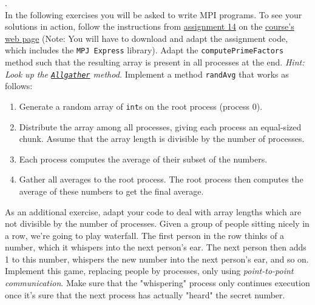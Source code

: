 \documentclass[main]{subfiles}
\begin{document}
\begin{ExerciseList}
    
    \Exercise[title={Message Passing},label=MPI]. \quad \\
        In the following exercises you will be asked to write MPI programs. To see your solutions in action, follow the instructions from \href{https://spcl.inf.ethz.ch/Teaching/2020-pp/exercises/assignment14.pdf}{assignment 14} on the \href{https://spcl.inf.ethz.ch/Teaching/2020-pp/}{course's web page} (Note: You will have to download and adapt the assignment code, which includes the \texttt{MPJ Express} library). 
        \Question Adapt the \texttt{computePrimeFactors} method such that the resulting array is present in all processes at the end. \textit{Hint: Look up the \href{https://www.open-mpi.org/doc/v3.0/man3/MPI_Allgather.3.php}{\texttt{Allgather}} method.}
        \Question Implement a method \texttt{randAvg} that works as follows:
            \begin{enumerate}
                \item Generate a random array of \texttt{int}s on the root process (process 0).
                \item Distribute the array among all processes, giving each process an equal-sized chunk. Assume that the array length is divisible by the number of processes.
                \item Each process computes the average of their subset of the numbers.
                \item Gather all averages to the root process. The root process then computes the average of these numbers to get the final average.
            \end{enumerate}
            As an additional exercise, adapt your code to deal with array lengths which are not divisible by the number of processes.
        \Question Given a group of people sitting nicely in a row, we're going to play waterfall. The first person in the row thinks of a number, which it whispers into the next person's ear. The next person then adds 1 to this number, whispers the new number into the next person's ear, and so on. Implement this game, replacing people by processes, only using \textit{point-to-point communication}. Make sure that the "whispering" process only continues execution once it's sure that the next process has actually "heard" the secret number.
    

\end{ExerciseList}
\end{document}
